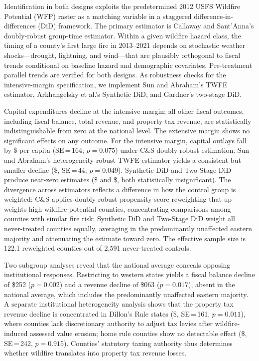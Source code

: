 \documentclass[12pt]{article}
\begin{document}
Identification in both designs exploits the predetermined 2012 USFS Wildfire
Potential (WFP) raster as a matching variable in a staggered
difference-in-differences (DiD) framework. The primary estimator is Callaway and
Sant'Anna's \citeyearpar{callaway2021} doubly-robust group-time estimator.
Within a given wildfire hazard class, the timing of a county's first large
fire in 2013--2021 depends on stochastic weather shocks---drought, lightning,
and wind---that are plausibly orthogonal to fiscal trends conditional on
baseline hazard and demographic covariates. Pre-treatment parallel trends are verified for both designs. As robustness checks for the intensive-margin
specification, we implement Sun and Abraham's \citeyearpar{sun2021} TWFE estimator,
Arkhangelsky et al.'s \citeyearpar{arkhangelsky2021} Synthetic DiD, and
Gardner's \citeyearpar{gardner2022} two-stage DiD.

Capital expenditures decline at the intensive margin; all other fiscal outcomes,
including fiscal balance, total revenue, and property tax revenue, are
statistically indistinguishable from zero at the national level. The extensive
margin shows no significant effects on any outcome. For the intensive margin,
capital outlays fall by \$ per capita (SE\,=\,164; $p = 0.075$) under C\&S
doubly-robust estimation. Sun and Abraham's heterogeneity-robust TWFE estimator
yields a consistent but smaller decline (\$, SE\,=\,44; $p = 0.049$).
Synthetic DiD and Two-Stage DiD produce near-zero estimates (\$ and \$,
both statistically insignificant). The divergence across estimators reflects a
difference in how the control group is weighted: C\&S applies doubly-robust
propensity-score reweighting that up-weights high-wildfire-potential counties,
concentrating comparisons among counties with similar fire risk; Synthetic DiD
and Two-Stage DiD weight all never-treated counties equally, averaging in the
predominantly unaffected eastern majority and attenuating the estimate toward
zero. The effective sample size is 122.1 reweighted counties out of 2,591
never-treated controls.

Two subgroup analyses reveal that the national average conceals opposing institutional
responses. Restricting to western states yields a fiscal balance decline of
\$252 ($p = 0.002$) and a revenue decline of \$063 ($p = 0.017$),
absent in the national average, which includes the predominantly unaffected eastern
majority. A separate institutional heterogeneity analysis shows that the property
tax revenue decline is concentrated in Dillon's Rule states (\$, SE\,=\,161,
$p = 0.011$), where counties lack discretionary authority to adjust tax levies after
wildfire-induced assessed value erosion; home rule counties show no detectable effect
(\$, SE\,=\,242, $p = 0.915$). Counties' statutory taxing authority thus
determines whether wildfire translates into property tax revenue losses.
\end{document}
